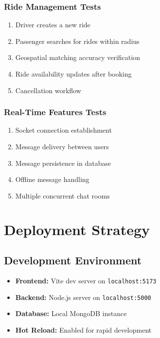 \documentclass[12pt,a4paper]{article}
\begin{document}
\subsubsection{Ride Management Tests}
\begin{enumerate}
    \item Driver creates a new ride
    \item Passenger searches for rides within radius
    \item Geospatial matching accuracy verification
    \item Ride availability updates after booking
    \item Cancellation workflow
\end{enumerate}

\subsubsection{Real-Time Features Tests}
\begin{enumerate}
    \item Socket connection establishment
    \item Message delivery between users
    \item Message persistence in database
    \item Offline message handling
    \item Multiple concurrent chat rooms
\end{enumerate}

\newpage

\section{Deployment Strategy}

\subsection{Development Environment}

\begin{itemize}
    \item \textbf{Frontend:} Vite dev server on \texttt{localhost:5173}
    \item \textbf{Backend:} Node.js server on \texttt{localhost:5000}
    \item \textbf{Database:} Local MongoDB instance
    \item \textbf{Hot Reload:} Enabled for rapid development
\end{itemize}
\end{document}
